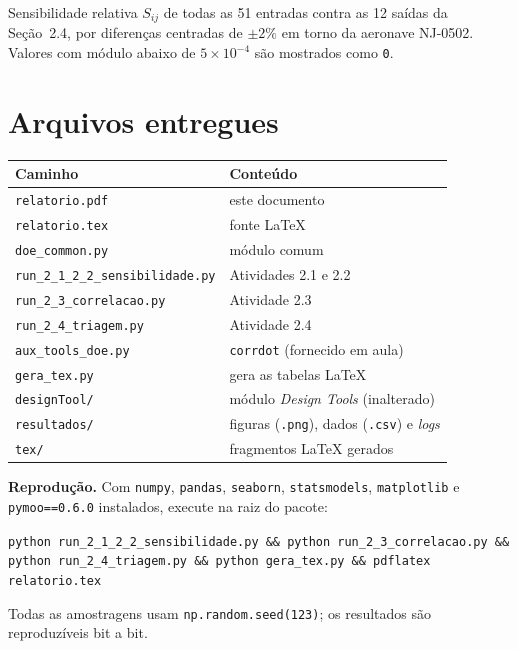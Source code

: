 \documentclass[11pt,a4paper]{article}
\newcommand{\code}[1]{\texttt{\small #1}}
\begin{document}
Sensibilidade relativa $S_{ij}$ de todas as 51 entradas contra as 12 sa\'idas
da Se\c{c}\~ao~2.4, por diferen\c{c}as centradas de $\pm 2\%$ em torno da
aeronave NJ-0502. Valores com m\'odulo abaixo de $5\times10^{-4}$ s\~ao
mostrados como \code{0}.

{\scriptsize}

\section{Arquivos entregues}

\begin{center}
\begin{tabular}{ll}
\toprule
Caminho & Conte\'udo \\
\midrule
\code{relatorio.pdf}                     & este documento \\
\code{relatorio.tex}                     & fonte \LaTeX{} \\
\code{doe\_common.py}                    & m\'odulo comum \\
\code{run\_2\_1\_2\_2\_sensibilidade.py} & Atividades 2.1 e 2.2 \\
\code{run\_2\_3\_correlacao.py}          & Atividade 2.3 \\
\code{run\_2\_4\_triagem.py}             & Atividade 2.4 \\
\code{aux\_tools\_doe.py}                & \code{corrdot} (fornecido em aula) \\
\code{gera\_tex.py}                      & gera as tabelas \LaTeX{} \\
\code{designTool/}                       & m\'odulo \emph{Design Tools} (inalterado) \\
\code{resultados/}                       & figuras (\code{.png}), dados (\code{.csv}) e \emph{logs} \\
\code{tex/}                              & fragmentos \LaTeX{} gerados \\
\bottomrule
\end{tabular}
\end{center}

\vspace{0.4cm}
\noindent
\textbf{Reprodu\c{c}\~ao.} Com \code{numpy}, \code{pandas}, \code{seaborn},
\code{statsmodels}, \code{matplotlib} e \code{pymoo==0.6.0} instalados, execute
na raiz do pacote:

\begin{center}
\code{python run\_2\_1\_2\_2\_sensibilidade.py \&\& python run\_2\_3\_correlacao.py \&\&}\\
\code{python run\_2\_4\_triagem.py \&\& python gera\_tex.py \&\& pdflatex relatorio.tex}
\end{center}

\noindent
Todas as amostragens usam \code{np.random.seed(123)}; os resultados s\~ao
reproduz\'iveis bit a bit.
\end{document}
